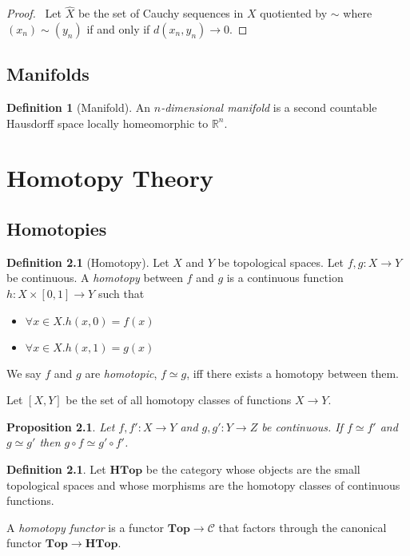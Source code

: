 \documentclass{book}
\let\qed\relax
\newtheorem{prop}[ax]{Proposition}
\theoremstyle{definition}
\newtheorem{df}[ax]{Definition}
\newcommand{\Top}{\ensuremath{\mathbf{Top}}}
\begin{document}
\begin{proof}
\pf\ Let $\hat{X}$ be the set of Cauchy sequences in $X$ quotiented by $\sim$ where $(x_n) \sim (y_n)$ if and only if $d(x_n, y_n) \rightarrow 0$. \qed
\end{proof}

\section{Manifolds}

\begin{df}[Manifold]
An \emph{$n$-dimensional manifold} is a second countable Hausdorff space locally homeomorphic to $\mathbb{R}^n$.
\end{df}

\chapter{Homotopy Theory}

\section{Homotopies}

\begin{df}[Homotopy]
Let $X$ and $Y$ be topological spaces. Let $f,g : X \rightarrow Y$ be continuous. A \emph{homotopy} between $f$ and $g$ is a continuous function $h : X \times [0,1] \rightarrow Y$ such that
\begin{itemize}
\item $\forall x \in X. h(x,0) = f(x)$
\item $\forall x \in X. h(x,1) = g(x)$
\end{itemize}
We say $f$ and $g$ are \emph{homotopic}, $f \simeq g$, iff there exists a homotopy between them.

Let $[X,Y]$ be the set of all homotopy classes of functions $X \rightarrow Y$.
\end{df}

\begin{prop}
Let $f,f' : X \rightarrow Y$ and $g,g' : Y \rightarrow Z$ be continuous. If $f \simeq f'$ and $g \simeq g'$ then $g \circ f \simeq g' \circ f'$.
\end{prop}

\begin{df}
Let $\mathbf{HTop}$ be the category whose objects are the small topological spaces and whose morphisms are the homotopy classes of continuous functions.

A \emph{homotopy functor} is a functor $\Top \rightarrow \mathcal{C}$ that factors through the canonical functor $\Top \rightarrow \mathbf{HTop}$.
\end{df}
\end{document}
